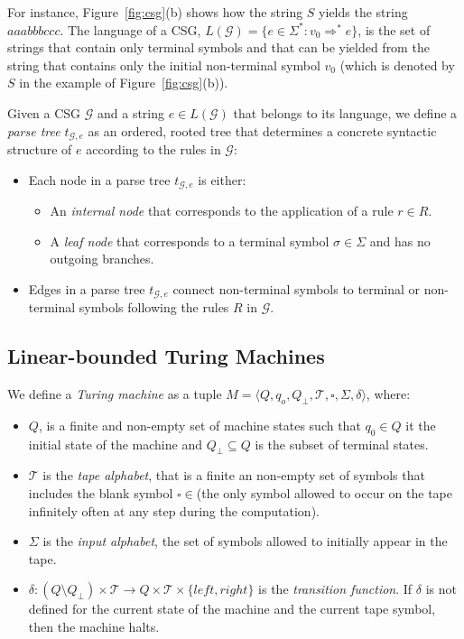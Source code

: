 \documentclass[letterpaper]{article} %
\newcommand{\tup}[1]{{\langle #1 \rangle}}
\begin{document}
For instance, Figure~\ref{fig:csg}(b) shows how the string $S$ yields the string $aaabbbccc$. The language of a CSG, $L(\mathcal{G})=\{e\in \Sigma^*: v_0\Rightarrow^* e\}$, is the set of strings that contain only terminal symbols and that can be yielded from the string that contains only the initial non-terminal symbol $v_0$ (which is denoted by $S$ in the example of Figure~\ref{fig:csg}(b)).

Given a CSG $\mathcal{G}$ and a string $e\in L(\mathcal{G})$ that belongs to its language, we define a {\it parse tree} $t_{\mathcal{G},e}$ as an ordered, rooted tree that determines a concrete syntactic structure of $e$ according to the rules in $\mathcal{G}$:
\begin{itemize}
\item Each node in a parse tree $t_{\mathcal{G},e}$ is either:
\begin{itemize}
\item An {\it internal node} that corresponds to the application of a rule $r\in R$.
\item A {\it leaf node} that corresponds to a terminal symbol $\sigma\in \Sigma$ and has no outgoing branches.
\end{itemize}
\item Edges in a parse tree $t_{\mathcal{G},e}$ connect non-terminal symbols to terminal or non-terminal symbols following the rules $R$ in $\mathcal{G}$.
\end{itemize}


\subsection{Linear-bounded Turing Machines}
We define a {\em Turing machine} as a tuple $M=\tup{Q,q_o,Q_{\bot},\mathcal{T},\square,\Sigma,\delta}$, where:
\begin{itemize}
\item $Q$, is a finite and non-empty set of machine states such that $q_0\in Q$ it the initial state of the machine and $Q_{\bot}\subseteq Q$ is the subset of terminal states.  
\item $\mathcal{T}$ is the {\em tape alphabet}, that is a finite an non-empty set of symbols that includes the blank symbol $\square\in$(the only symbol allowed to occur on the tape infinitely often at any step during the computation).
\item $\Sigma$ is the {\em input alphabet}, the set of symbols allowed to initially appear in the tape.
\item $\delta: (Q\setminus Q_{\bot})\times \mathcal{T}\rightarrow Q\times \mathcal{T}\times\{left,right\}$ is the {\em transition function}. If $\delta$ is not defined for the current state of the machine and the current tape symbol, then the machine halts.
\end{itemize}
\end{document}
